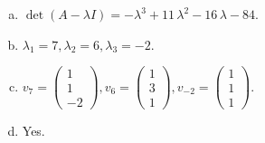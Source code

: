 \begin{questions}
\begin{solution}
\begin{enumerate}[(a)]
\item $\det(A-\lambda I)=-{\lambda}^{3} + 11 \, {\lambda}^{2} - 16 \, {\lambda} - 84$.
\item ${\lambda}_1=7, {\lambda}_2=6, {\lambda}_3=-2$.
\item $v_{7}=\left(\begin{array}{r}
1 \\
1 \\
-2
\end{array}\right), v_{6}=\left(\begin{array}{r}
1 \\
3 \\
1
\end{array}\right), v_{-2}=\left(\begin{array}{r}
1 \\
1 \\
1
\end{array}\right)$.
\item Yes.
\end{enumerate}
\end{solution}

\end{questions}

\newpage


\begin{center}
\end{center}

